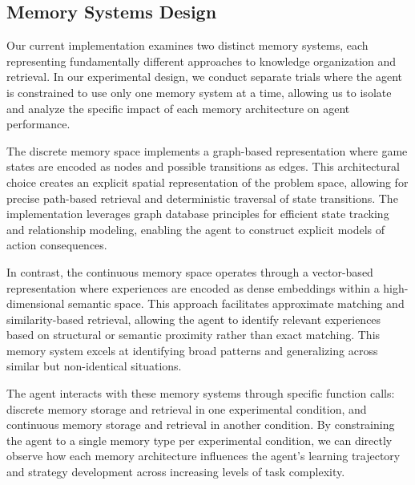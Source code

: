 \documentclass{article}
\begin{document}
\subsection{Memory Systems Design}

Our current implementation examines two distinct memory systems, each representing fundamentally different approaches to knowledge organization and retrieval. In our experimental design, we conduct separate trials where the agent is constrained to use only one memory system at a time, allowing us to isolate and analyze the specific impact of each memory architecture on agent performance.

The discrete memory space implements a graph-based representation where game states are encoded as nodes and possible transitions as edges. This architectural choice creates an explicit spatial representation of the problem space, allowing for precise path-based retrieval and deterministic traversal of state transitions. The implementation leverages graph database principles for efficient state tracking and relationship modeling, enabling the agent to construct explicit models of action consequences.

In contrast, the continuous memory space operates through a vector-based representation where experiences are encoded as dense embeddings within a high-dimensional semantic space. This approach facilitates approximate matching and similarity-based retrieval, allowing the agent to identify relevant experiences based on structural or semantic proximity rather than exact matching. This memory system excels at identifying broad patterns and generalizing across similar but non-identical situations.

The agent interacts with these memory systems through specific function calls: discrete memory storage and retrieval in one experimental condition, and continuous memory storage and retrieval in another condition. By constraining the agent to a single memory type per experimental condition, we can directly observe how each memory architecture influences the agent's learning trajectory and strategy development across increasing levels of task complexity.


\end{document}
